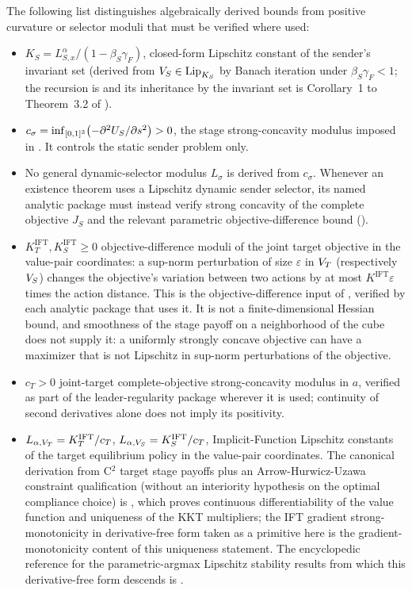 The following list distinguishes algebraically derived bounds from
positive curvature or selector moduli that must be verified where
used:
\begin{itemize}[leftmargin=2em]
\item $K_S=L_{S,x}^{\alpha}/(1-\beta_S\gamma_F)$, closed-form Lipschitz
constant of the sender's invariant set (derived from $V_S\in\mathrm{Lip}_{K_S}$
by Banach iteration under $\beta_S\gamma_F<1$; the recursion is \citet[Thm.~4.2(c)]{Hinderer2005} and its inheritance by the invariant set is Corollary~1 to Theorem~3.2 of \citet{StokeyLucas1989}).
\item $c_\sigma=\inf_{[0,1]^3}\bigl(-\partial^2U_S/\partial s^2\bigr)>0$,
the stage strong-concavity modulus imposed in
. It controls the static sender problem only.
\item No general dynamic-selector modulus $L_\sigma$ is derived from
$c_\sigma$. Whenever an existence theorem uses a Lipschitz dynamic
sender selector, its named analytic package must instead verify strong
concavity of the complete objective $J_S$ and the relevant
parametric objective-difference bound
(\citealp{KlatteKummer2002,DoraszelskiPakes2007}).
\item $K_T^{\mathrm{IFT}},K_S^{\mathrm{IFT}}\ge0$ objective-difference
moduli of the joint target objective in the value-pair coordinates: a
sup-norm perturbation of size $\varepsilon$ in $V_T$ (respectively
$V_S$) changes the objective's variation between two actions by at most
$K^{\mathrm{IFT}}\varepsilon$ times the action distance. This is the
objective-difference input of
, verified by
each analytic package that uses it. It is not a finite-dimensional
Hessian bound, and smoothness of the stage payoff on a neighborhood of
the cube does not supply it: a uniformly strongly concave objective can
have a maximizer that is not Lipschitz in sup-norm perturbations of the
objective.
\item $c_T>0$ joint-target complete-objective strong-concavity modulus
in $a$, verified as part of the leader-regularity package wherever it
is used; continuity of second derivatives alone does not imply its
positivity.
\item $L_{\alpha,V_T}=K_T^{\mathrm{IFT}}/c_T$,
$L_{\alpha,V_S}=K_S^{\mathrm{IFT}}/c_T$, Implicit-Function Lipschitz
constants of the target equilibrium policy in the value-pair
coordinates. The canonical derivation from C${}^2$ target stage
payoffs plus an Arrow-Hurwicz-Uzawa constraint qualification (without
an interiority hypothesis on the optimal compliance choice) is
\citet{RinconZapateroSantos2009}, which proves continuous
differentiability of the value function and uniqueness of the KKT
multipliers; the IFT gradient strong-monotonicity in derivative-free form taken
as a primitive here is
the gradient-monotonicity content of this uniqueness statement. The
encyclopedic reference for the parametric-argmax Lipschitz stability
results from which this derivative-free form descends is
\citet[Ch.~2 + Ch.~7]{KlatteKummer2002}.
\end{itemize}


